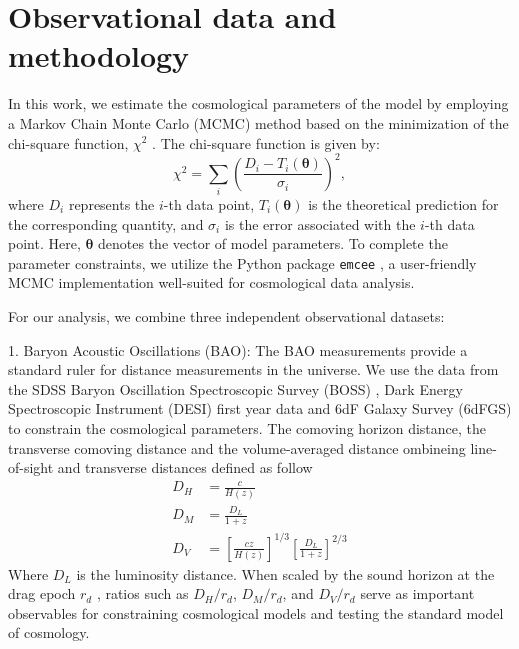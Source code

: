 \documentclass[a4paper,fleqn]{cas-sc}
\begin{document}

\section{Observational data and methodology}\label{sec:data}

In this work, we estimate the cosmological parameters of the model by employing a Markov Chain Monte Carlo (MCMC) method based on the minimization of the chi-square function, $\chi^2$ \cite{Padilla_2021}. The chi-square function is given by:
\begin{equation}
\chi^2 = \sum_i \left(\frac{D_i - T_i(\mathbf{\theta})}{\sigma_i}\right)^2,
\end{equation}
where $D_i$ represents the $i$-th data point, $T_i(\mathbf{\theta})$ is the theoretical prediction for the corresponding quantity, and $\sigma_i$ is the error associated with the $i$-th data point. Here, $\mathbf{\theta}$ denotes the vector of model parameters. To complete the parameter constraints, we utilize the Python package \texttt{emcee} \cite{emcee}, a user-friendly MCMC implementation well-suited for cosmological data analysis.


For our analysis, we combine three independent observational datasets:

1. Baryon Acoustic Oscillations (BAO): The BAO measurements provide a standard ruler for distance measurements in the universe. We use the data from the SDSS Baryon Oscillation Spectroscopic Survey (BOSS) , Dark Energy Spectroscopic Instrument (DESI) first year data and 6dF Galaxy Survey (6dFGS) to constrain the cosmological parameters. The comoving horizon distance, the transverse comoving distance
and the volume-averaged distance ombineing line-of-sight and transverse distances defined as follow
\begin{align}
    D_H&=\frac{c}{H(z)} \\
    D_M&=\frac{D_L}{1+z}\\
    D_V&=\left[\frac{cz}{H(z)}\right]^{1/3}\left[\frac{D_L}{1+z}\right]^{2/3}
\end{align}
Where $D_L$ is the luminosity distance. When scaled by the sound horizon at the drag epoch $r_d$ , ratios such as $D_H/r_d$, $D_M/r_d$, and $D_V/r_d$ serve as important observables for constraining cosmological models and testing the standard model of cosmology.
\end{document}
